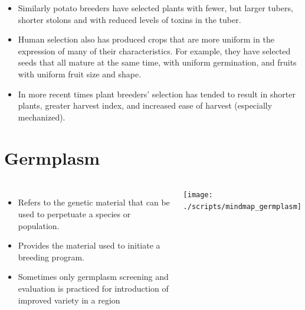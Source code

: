 \documentclass[11pt,ignorenonframetext,aspectratio=169]{beamer}
\providecommand{\tightlist}{%
  \setlength{\itemsep}{0pt}\setlength{\parskip}{0pt}}
\newcommand{\bcolumns}{\begin{columns}[T, onlytextwidth]}
\newcommand{\ecolumns}{\end{columns}}
\begin{document}
\begin{frame}{}
\protect\hypertarget{section-4}{}
\begin{itemize}
\item
  Similarly potato breeders have selected plants with fewer, but larger
  tubers, shorter stolons and with reduced levels of toxins in the
  tuber.
\item
  Human selection also has produced crops that are more uniform in the
  expression of many of their characteristics. For example, they have
  selected seeds that all mature at the same time, with uniform
  germination, and fruits with uniform fruit size and shape.
\item
  In more recent times plant breeders' selection has tended to result in
  shorter plants, greater harvest index, and increased ease of harvest
  (especially mechanized).
\end{itemize}
\end{frame}

\hypertarget{germplasm}{%
\section{Germplasm}\label{germplasm}}

\begin{frame}{}
\protect\hypertarget{section-5}{}
\bcolumns
{}

\begin{itemize}
\tightlist
\item
  Refers to the genetic material that can be used to perpetuate a
  species or population.
\item
  Provides the material used to initiate a breeding program.
\item
  Sometimes only germplasm screening and evaluation is practiced for
  introduction of improved variety in a region
\end{itemize}


\texttt{[image: ./scripts/mindmap\_germplasm]}

\ecolumns
\end{frame}
\end{document}
